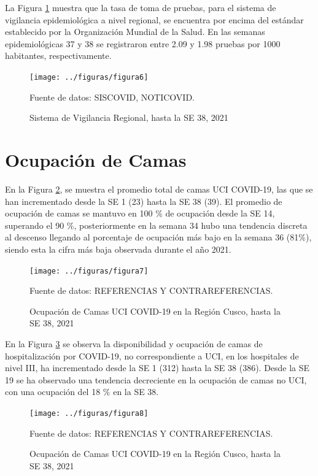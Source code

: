 \documentclass[12pt,a4paper,openany]{book}
\begin{document}
	\noindent La Figura \ref{fig:vigilancia_regional} muestra que la tasa de toma de pruebas, para el sistema de vigilancia epidemiológica a nivel regional, se encuentra por encima del estándar establecido por la Organización Mundial de la Salud. En las semanas epidemiológicas 37 y 38 se registraron entre 2.09 y 1.98 pruebas por 1000 habitantes, respectivamente.
	
	\begin{figure}[h]
	\caption{Sistema de Vigilancia Regional, hasta la SE 38, 2021 }\label{fig:vigilancia_regional}
	\begin{center}
		\texttt{[image: ../figuras/figura6]}
	\end{center}
	{\footnotesize {Fuente de datos: SISCOVID, NOTICOVID.}}
	\end{figure}

	\section*{Ocupación de Camas}
	\noindent En la Figura \ref{fig:ocupacion_uci}, se muestra el promedio total de camas UCI COVID-19, las que se han incrementado desde la SE 1 (23) hasta la SE 38 (39). El promedio de ocupación de camas se mantuvo en 100 $\%$ de ocupación desde la SE 14, superando el 90 $\%$, posteriormente en la semana 34 hubo una tendencia discreta al descenso llegando al porcentaje de ocupación más bajo en la semana 36 (81$\%$), siendo esta la cifra más baja observada durante el año 2021.
	
	\begin{figure}[h]
	\caption{Ocupación de Camas UCI COVID-19 en la Región Cusco, hasta la SE 38, 2021}\label{fig:ocupacion_uci}
	\begin{center}
		\texttt{[image: ../figuras/figura7]}
	\end{center}
	{\footnotesize {Fuente de datos: REFERENCIAS Y CONTRAREFERENCIAS.}}
	\end{figure}

	En la Figura \ref{fig:ocupacion_3_nivel} se observa la disponibilidad y ocupación de camas de hospitalización por COVID-19, no correspondiente a UCI, en los hospitales de nivel III, ha incrementado desde la SE 1 (312) hasta la SE 38 (386). Desde la SE 19 se ha observado una tendencia decreciente en la ocupación de camas no UCI, con una ocupación del 18 $\%$ en la SE 38.
	
	\begin{figure}[h]
	\caption{Ocupación de Camas UCI COVID-19 en la Región Cusco, hasta la SE 38, 2021}\label{fig:ocupacion_3_nivel}
	\begin{center}
		\texttt{[image: ../figuras/figura8]}
	\end{center}
	{\footnotesize {Fuente de datos: REFERENCIAS Y CONTRAREFERENCIAS.}}
	\end{figure}
\end{document}
